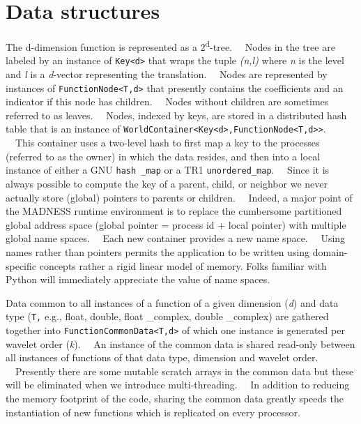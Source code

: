 \documentclass[letterpaper]{article}
\begin{document}
\section[Data structures]{Data structures}
The d-dimension function is represented as a 2\textsuperscript{d}{}-tree. \ \ Nodes in the tree are labeled by an
instance of \texttt{Key{\textless}d{\textgreater}} that wraps the tuple \textit{(n,l)} where \textit{n} is the level
and \textit{l} is a \textit{d}{}-vector representing the translation. \ \ Nodes are represented by instances of
\texttt{FunctionNode{\textless}T,d{\textgreater}} that presently contains the coefficients and an indicator if this
node has children. \ \ Nodes without children are sometimes referred to as leaves. \ \ Nodes, indexed by keys, are
stored in a distributed hash table that is an instance of
\texttt{WorldContainer{\textless}Key{\textless}d{\textgreater},FunctionNode{\textless}T,d{\textgreater}{\textgreater}}.
\ \ This container uses a two-level hash to first map a key to the processes (referred to as the owner) in which the
data resides, and then into a local instance of either a GNU \texttt{hash \_map} or a TR1 \texttt{unordered\_map}.
\ \ Since it is always possible to compute the key of a parent, child, or neighbor we never actually store (global)
pointers to parents or children. \ \ Indeed, a major point of the MADNESS runtime environment is to replace the
cumbersome partitioned global address space (global pointer = process id + local pointer) with multiple global name
spaces. \ \ Each new container provides a new name space. \ \ Using names rather than pointers permits the application
to be written using domain-specific concepts rather a rigid linear model of memory. Folks familiar with Python will
immediately appreciate the value of name spaces.

Data common to all instances of a function of a given dimension (\textit{d}) and data type (\texttt{T,} e.g., float,
double, float \_complex, double \_complex) are gathered together into
\texttt{FunctionCommonData{\textless}T,d{\textgreater}} of which one instance is generated per wavelet order
(\textit{k}). \ \ An instance of the common data is shared read-only between all instances of functions of that data
type, dimension and wavelet order. \ \ Presently there are some mutable scratch arrays in the common data but these
will be eliminated when we introduce multi-threading. \ \ In addition to reducing the memory footprint of the code,
sharing the common data greatly speeds the instantiation of new functions which is replicated on every processor.
\end{document}
